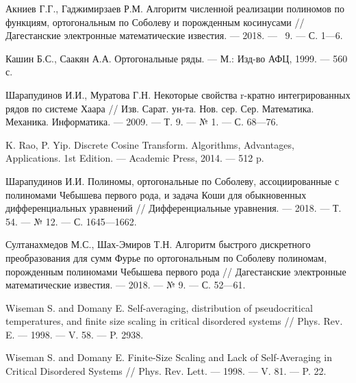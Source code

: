 \begin{thebibliography}{111}
{Акниев Г.Г., Гаджимирзаев Р.М.} Алгоритм численной реализации полиномов по функциям, ортогональным по Соболеву и порожденным косинусами // Дагестанские электронные математические известия. --- 2018. --- \No\ 9. --- С. 1---6.












Кашин Б.С., Саакян А.А. Ортогональные ряды. --- М.: Изд-во АФЦ, 1999. --- 560 с.



Шарапудинов И.И., Муратова Г.Н. Некоторые свойства r-кратно интегрированных рядов по системе Хаара // Изв. Сарат. ун-та. Нов. сер. Сер. Математика. Механика. Информатика. --- 2009. --- Т. 9. --- № 1. --- С. 68---76.




K. Rao, P. Yip. Discrete Cosine Transform. Algorithms, Advantages, Applications. 1st Edition. --- Academic Press, 2014. --- 512 p.




Шарапудинов И.И. Полиномы, ортогональные по Соболеву, ассоциированные с полиномами Чебышева первого рода, и задача Коши для обыкновенных дифференциальных уравнений // Дифференциальные уравнения. --- 2018. --- Т. 54. --- № 12. --- С. 1645---1662.



Султанахмедов М.С., Шах-Эмиров Т.Н. Алгоритм быстрого дискретного преобразования для сумм Фурье по ортогональным по Соболеву полиномам, порожденным полиномами Чебышева первого рода // Дагестанские электронные математические известия. --- 2018. --- № 9. --- С. 52---61.


Wiseman S. and Domany E. Self-averaging, distribution of pseudocritical temperatures, and finite size scaling in critical disordered systems // Phys. Rev. E. --- 1998. ---  V. 58. --- P. 2938.



Wiseman S. and Domany E. Finite-Size Scaling and Lack of Self-Averaging in Critical Disordered Systems // Phys. Rev. Lett. --- 1998. --- V. 81. --- P. 22.




\end{thebibliography}
